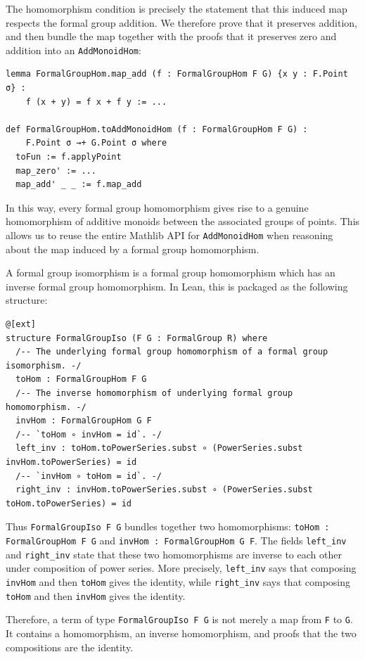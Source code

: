 The homomorphism condition is precisely the statement that this induced
map respects the formal group addition.  We therefore prove that it
preserves addition, and then bundle the map together with the proofs
that it preserves zero and addition into an \lstinline|AddMonoidHom|:

\begin{lstlisting}
lemma FormalGroupHom.map_add (f : FormalGroupHom F G) {x y : F.Point σ} :
    f (x + y) = f x + f y := ...

def FormalGroupHom.toAddMonoidHom (f : FormalGroupHom F G) :
    F.Point σ →+ G.Point σ where
  toFun := f.applyPoint
  map_zero' := ...
  map_add' _ _ := f.map_add
\end{lstlisting}

In this way, every formal group homomorphism gives rise to a genuine
homomorphism of additive monoids between the associated groups of points.
This allows us to reuse the entire Mathlib API for \lstinline|AddMonoidHom|
when reasoning about the map induced by a formal group homomorphism.

A formal group isomorphism is a formal group homomorphism which has an
inverse formal group homomorphism.  In Lean, this is packaged as the
following structure:
\begin{lstlisting}
@[ext]
structure FormalGroupIso (F G : FormalGroup R) where
  /-- The underlying formal group homomorphism of a formal group isomorphism. -/
  toHom : FormalGroupHom F G
  /-- The inverse homomorphism of underlying formal group homomorphism. -/
  invHom : FormalGroupHom G F
  /-- `toHom ∘ invHom = id`. -/
  left_inv : toHom.toPowerSeries.subst ∘ (PowerSeries.subst invHom.toPowerSeries) = id
  /-- `invHom ∘ toHom = id`. -/
  right_inv : invHom.toPowerSeries.subst ∘ (PowerSeries.subst toHom.toPowerSeries) = id
\end{lstlisting}

Thus \lstinline|FormalGroupIso F G| bundles together two homomorphisms:
\lstinline|toHom : FormalGroupHom F G| and
\lstinline|invHom : FormalGroupHom G F|.
The fields \lstinline|left_inv| and \lstinline|right_inv| state that
these two homomorphisms are inverse to each other under composition of
power series.  More precisely, \lstinline|left_inv| says that composing
\lstinline|invHom| and then \lstinline|toHom| gives the identity, while
\lstinline|right_inv| says that composing \lstinline|toHom| and then
\lstinline|invHom| gives the identity.

Therefore, a term of type \lstinline|FormalGroupIso F G| is not merely a
map from \lstinline|F| to \lstinline|G|.  It contains a homomorphism, an
inverse homomorphism, and proofs that the two compositions are the
identity.

